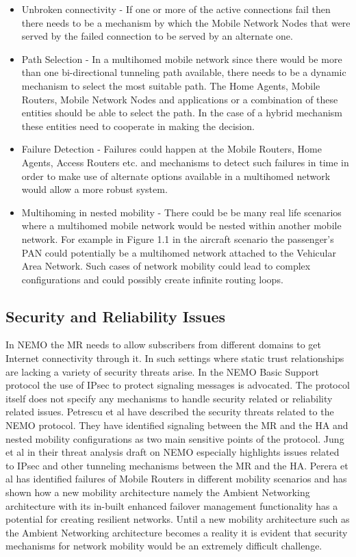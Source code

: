 \begin{itemize}
\item Unbroken connectivity - If one or more of the active connections fail
then there needs to be a mechanism by which the Mobile Network Nodes that were
served by the failed connection to be served by an alternate one.

\item Path Selection - In a multihomed mobile network since there would be
more than one bi-directional tunneling path available, there needs to be a
dynamic mechanism to select the most suitable path. The Home Agents, Mobile
Routers, Mobile Network Nodes and applications or a combination of these
entities should be able to select the path. In the case of a hybrid mechanism
these entities need to cooperate in making the decision.

\item Failure Detection - Failures could happen at the Mobile Routers, Home
Agents, Access Routers etc. and mechanisms to detect such
failures in time in order to make use of alternate options available in a
multihomed network would allow a more robust system.

\item Multihoming in nested mobility - There could be be many real life
scenarios where a multihomed mobile network would be nested within another
mobile network. For example in Figure 1.1 in the aircraft scenario the passenger's
PAN could potentially be a multihomed network attached to the Vehicular Area Network. Such cases of network mobility could lead to complex configurations and could possibly create infinite routing loops.
\end{itemize}

\subsection{Security and Reliability Issues}

In NEMO the MR needs to allow subscribers from different domains to get
Internet connectivity through it. In such settings where static trust
relationships are lacking a variety of security threats arise. In the NEMO
Basic Support protocol the use of IPsec to protect signaling messages is
advocated. The protocol itself does not specify any mechanisms to handle
security related or reliability related issues. Petrescu et al \cite{18} have
described the security threats related to the NEMO protocol. They have
identified signaling between the MR and the HA and nested mobility
configurations as two main sensitive points of the protocol. Jung et al
\cite{19} in their threat analysis draft on NEMO especially highlights issues
related to IPsec and other tunneling mechanisms between the MR and the HA.
Perera et al \cite{20} has identified failures of Mobile Routers in different
mobility scenarios and has shown how a new mobility architecture namely the
Ambient Networking architecture \cite{21} with its in-built enhanced failover
management functionality has a potential for creating resilient networks.
Until a new mobility architecture such as the Ambient Networking architecture
becomes a reality it is evident that security mechanisms for network mobility
would be an extremely difficult challenge.

